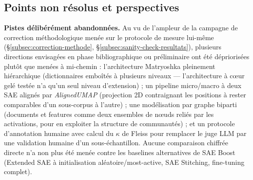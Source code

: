 \documentclass[11pt]{article}
\begin{document}
\subsection{Points non résolus et perspectives}

\textbf{Pistes délibérément abandonnées.} Au vu de l'ampleur de la campagne
de correction méthodologique menée sur le protocole de mesure lui-même
(\S\ref{subsec:correction-methode}, \S\ref{subsec:sanity-check-resultats}),
plusieurs directions envisagées en phase bibliographique ou préliminaire ont
été dépriorisées plutôt que menées à mi-chemin : l'architecture Matryoshka
pleinement hiérarchique (dictionnaires emboîtés à plusieurs niveaux ---
l'architecture à cœur gelé testée n'a qu'un seul niveau d'extension) ; un
pipeline micro/macro à deux SAE alignés par \emph{AlignedUMAP} (projection 2D
contraignant les positions à rester comparables d'un sous-corpus à l'autre) ;
une modélisation par graphe biparti (documents et features comme deux
ensembles de nœuds reliés par les activations, pour en exploiter la structure
de communautés) ; et un protocole d'annotation humaine avec calcul du
$\kappa$ de Fleiss pour remplacer le juge LLM par une validation humaine d'un
sous-échantillon. Aucune comparaison chiffrée directe n'a non plus été menée
contre les baselines alternatives de SAE Boost (Extended SAE à
initialisation aléatoire/most-active, SAE Stitching, fine-tuning complet).
\end{document}

